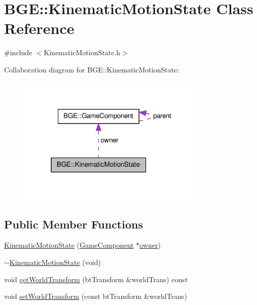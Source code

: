 \hypertarget{class_b_g_e_1_1_kinematic_motion_state}{\section{B\-G\-E\-:\-:Kinematic\-Motion\-State Class Reference}
\label{class_b_g_e_1_1_kinematic_motion_state}
}


{\ttfamily \#include $<$Kinematic\-Motion\-State.\-h$>$}



Collaboration diagram for B\-G\-E\-:\-:Kinematic\-Motion\-State\-:
\nopagebreak
\begin{figure}[H]
\begin{center}
\leavevmode
\includegraphics[width=259pt]{class_b_g_e_1_1_kinematic_motion_state__coll__graph}
\end{center}
\end{figure}
\subsection*{Public Member Functions}
\begin{DoxyCompactItemize}
\item 
\hyperlink{class_b_g_e_1_1_kinematic_motion_state_af7f41d1f1dfa78e3696fc376458bc4bc}{Kinematic\-Motion\-State} (\hyperlink{class_b_g_e_1_1_game_component}{Game\-Component} $\ast$\hyperlink{class_b_g_e_1_1_kinematic_motion_state_abe8f906a98a54663660e2aae73f0f226}{owner})
\item 
\hyperlink{class_b_g_e_1_1_kinematic_motion_state_afdf3922dadb1e3e695cf81eaddcf4ae7}{$\sim$\-Kinematic\-Motion\-State} (void)
\item 
void \hyperlink{class_b_g_e_1_1_kinematic_motion_state_a967a329efa2f93d95e6187143191f434}{get\-World\-Transform} (bt\-Transform \&world\-Trans) const 
\item 
void \hyperlink{class_b_g_e_1_1_kinematic_motion_state_abae1e2a414a9d1d5db77bdc84daaeee5}{set\-World\-Transform} (const bt\-Transform \&world\-Trans)
\end{DoxyCompactItemize}
